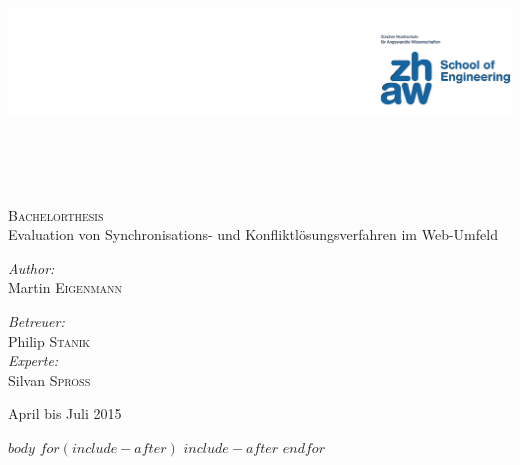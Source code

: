 \documentclass[ oneside,openright,titlepage,numbers=noenddot,headinclude,%
                BCOR=5mm,paper=a4,fontsize=11pt,%
                ngerman,american,%
                ]{scrreprt}
\makeatletter
\def\maxwidth{\ifdim\Gin@nat@width>\linewidth\linewidth
\else\Gin@nat@width\fi}
\let\Oldincludegraphics\includegraphics
\renewcommand{\includegraphics}[1]{\Oldincludegraphics[width=\maxwidth,height=20em,keepaspectratio]{#1}}
\makeatother
\begin{document}
 

\begin{titlepage}

\begin{center}


\includegraphics{./images/zhaw.png}\\[5cm]
\textsc{\Large Bachelorthesis}\\[1cm]
{\huge Evaluation von Synchronisations- und Konfliktlösungsverfahren im Web-Umfeld}\\[6.0cm]


\begin{minipage}{0.4\textwidth}
\begin{flushleft} \large \emph{Author:}\\ Martin \textsc{Eigenmann} \end{flushleft}
\end{minipage} 
\hfill 
\begin{minipage}{0.4\textwidth}
\begin{flushright} 
\large \emph{Betreuer:} \\ Philip \textsc{Stanik} \\[1cm]
\large \emph{Experte:} \\ Silvan \textsc{Spross}
\end{flushright} 
\end{minipage}

\vfill

{\large April bis Juli 2015}
\end{center}
\end{titlepage}

$body$
$for(include-after)$
  $include-after$
$endfor$
\end{document}

